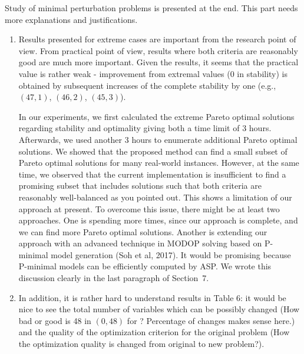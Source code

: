\documentclass[a4j]{article}
\begin{document}
\begin{it}\color{blue}
Study of minimal perturbation problems is presented at the end. This
part needs more explanations and justifications. 
\end{it}
\begin{enumerate}
\item 
  \begin{it}\color{blue}
  Results presented for extreme cases are important from the
  research point of view. From practical point of view, results where
  both criteria are reasonably good are much more important.  Given
  the results, it seems that the practical value is rather weak -
  improvement from extremal values (0 in stability) is obtained by
  subsequent increases of the complete stability by one (e.g., 
  $(47,1)$, $(46,2)$, $(45,3)$).
  \end{it}

In our experiments, 
we first calculated the extreme Pareto optimal solutions regarding
stability and optimality giving both a time limit of 3 hours.
Afterwards, we used another 3 hours to enumerate additional Pareto
optimal solutions.
We showed that the proposed method can find a small subset
of Pareto optimal solutions for many real-world instances.
However, at the same time, 
we observed that the current implementation
is insufficient to find a promising subset that includes solutions
such that both criteria are reasonably well-balanced as you pointed out.
%
This shows a limitation of our approach at present.
To overcome this issue, there might be at least two approaches. 
One is spending more times, since our approach is complete, and we can
find more Pareto optimal solutions.
Another is extending our approach with an advanced technique in MODOP solving 
based on P-minimal model generation (Soh et al, 2017).
It would be promising because P-minimal models can be 
efficiently computed by ASP.
%
We wrote this discussion clearly in the last paragraph of Section~7.

\item 
  \begin{it}\color{blue}
  In addition, it is rather hard to understand results in Table 6:
  it would be nice to see the total number of variables which can be
  possibly changed 
  (How bad or good is 48 in $(0,48)$ for ? Percentage of changes makes sense here.) 
  and the quality of the optimization criterion for the original
  problem 
  (How the optimization quality is changed from original to new problem?).
  \end{it}


\end{enumerate}
\end{document}
